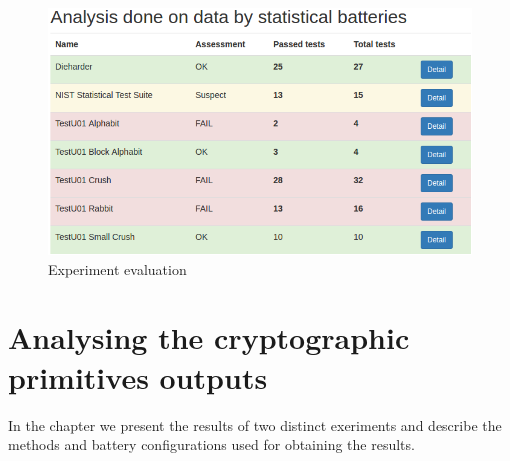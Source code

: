 \documentclass[
  digital,  	%
  color,		%
  oneside,   	%
  12pt,
  nocover,
  notable,
  nolof,
  nolot,
]{fithesis3}
\begin{document}
\begin{figure}[H]
\begin{nomar}
\centering
\includegraphics[width=\textwidth]{figures/rtt-assessment.png} 
\end{nomar}
\caption{Experiment evaluation}
\label{fig:rtt_assessment}
\end{figure}

\chapter{Analysing the cryptographic primitives outputs}




In the chapter we present the results of two distinct exeriments and describe the methods and battery configurations used for obtaining the results.
\end{document}

